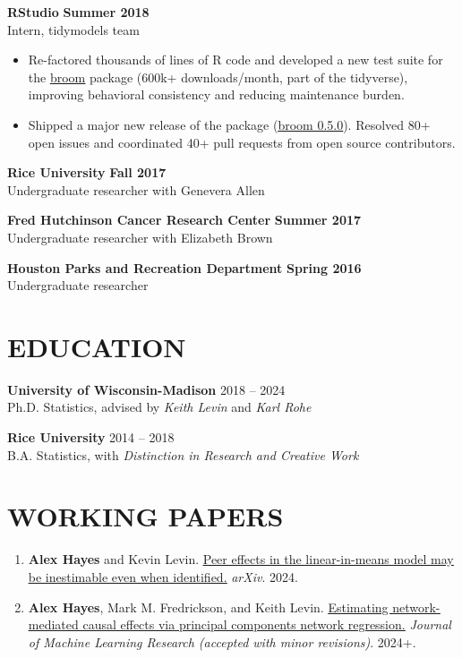 \documentclass[11pt]{article}
\newcommand{\underlinedlink}[2]{\href{#1}{\ul{#2}}}
\begin{document}
{\large \textbf{RStudio}} \hfill \textbf{Summer 2018}\\
Intern, tidymodels team
\begin{itemize}
    \item Re-factored thousands of lines of R code and developed a new test suite for the \underlinedlink{https://github.com/tidymodels/broom}{broom} package (600k+ downloads/month, part of the tidyverse), improving behavioral consistency and reducing maintenance burden.
    \item Shipped a major new release of the package (\underlinedlink{https://www.tidyverse.org/blog/2018/07/broom-0-5-0/}{broom 0.5.0}). Resolved 80+ open issues and coordinated 40+ pull requests from open source contributors.
\end{itemize}

{\large \textbf{Rice University}} \hfill \textbf{Fall 2017}\\
Undergraduate researcher with Genevera Allen

    {\large \textbf{Fred Hutchinson Cancer Research Center}} \hfill \textbf{Summer 2017}\\
Undergraduate researcher with Elizabeth Brown

    {\large \textbf{Houston Parks and Recreation Department}} \hfill \textbf{Spring 2016}\\
Undergraduate researcher

\section*{EDUCATION}

\textbf{University of Wisconsin-Madison} \hfill 2018 -- 2024\\
Ph.D. Statistics, advised by \emph{Keith Levin} and \emph{Karl Rohe}

\textbf{Rice University} \hfill 2014 -- 2018\\
B.A. Statistics, with \emph{Distinction in Research and Creative Work}


\section*{WORKING PAPERS}

\begin{enumerate}
    \item \textbf{Alex Hayes} and Kevin Levin. \underlinedlink{https://arxiv.org/abs/2410.10772}{Peer effects in the linear-in-means model may be inestimable even when identified.} \emph{arXiv}. 2024.
    \item \textbf{Alex Hayes}, Mark M. Fredrickson, and Keith Levin. \underlinedlink{http://arxiv.org/abs/2212.12041}{Estimating network-mediated causal effects via principal components network regression.} \emph{Journal of Machine Learning Research (accepted with minor revisions)}. 2024+.
\end{enumerate}
\end{document}
